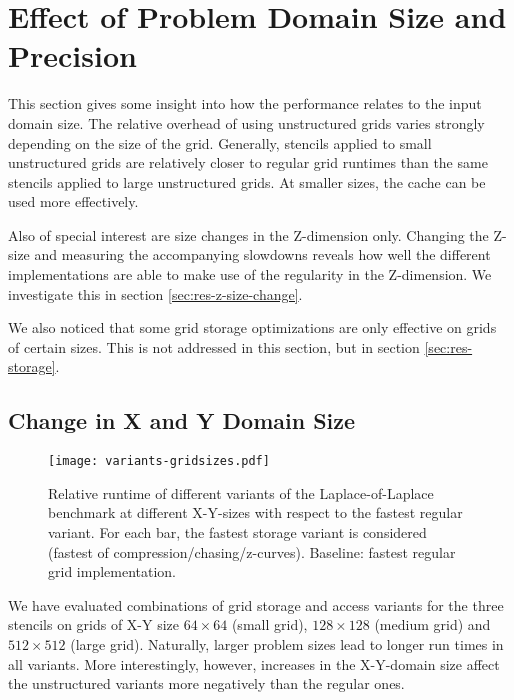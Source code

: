 \section{Effect of Problem Domain Size and Precision} \label{sec:res-size}

This section gives some insight into how the performance relates to the input domain size. The relative overhead of using unstructured grids varies strongly depending on the size of the grid. Generally, stencils applied to small unstructured grids are relatively closer to regular grid runtimes than the same stencils applied to large unstructured grids. At smaller sizes, the cache can be used more effectively.

Also of special interest are size changes in the Z-dimension only. Changing the Z-size and measuring the accompanying slowdowns reveals how well the different implementations are able to make use of the regularity in the Z-dimension. We investigate this in section \ref{sec:res-z-size-change}.

We also noticed that some grid storage optimizations are only effective on grids of certain sizes. This is not addressed in this section, but in section \ref{sec:res-storage}.

\subsection{Change in X and Y Domain Size}

\begin{figure}
    \texttt{[image: variants-gridsizes.pdf]}
    \caption{\label{fig:variants-gridsizes} Relative runtime of different variants of the Laplace-of-Laplace benchmark at different X-Y-sizes with respect to the fastest regular variant. For each bar, the fastest storage variant is considered (fastest of compression/chasing/z-curves). Baseline: fastest regular grid implementation.}
\end{figure}

We have evaluated combinations of grid storage and access variants for the three stencils on grids of X-Y size $64\times 64$ (small grid), $128\times 128$ (medium grid) and $512\times 512$ (large grid). Naturally, larger problem sizes lead to longer run times in all variants. More interestingly, however, increases in the X-Y-domain size affect the unstructured variants more negatively than the regular ones.

